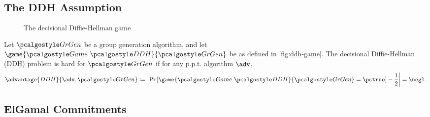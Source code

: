 \subsection{The DDH Assumption}

\begin{figure}[tbhp]
  \begin{center}
    \begin{tcolorbox}[width=6cm]
      \begin{pchstack}[center]
      \end{pchstack}
    \end{tcolorbox}
  \end{center}
  \caption{The decisional Diffie-Hellman game\label{fig:ddh-game}}
\end{figure}

\begin{definition}
  Let $\grgen$ be a group generation algorithm, and let $\game{\Game~\algo{DDH}}{\grgen}$ be as defined in \autoref{fig:ddh-game}.
  The decisional Diffie-Hellman (DDH) problem is hard for $\grgen$ if for any p.p.t. algorithm $\adv$,
  \[
  \advantage{DDH}{\adv, \grgen} \defeq \left|\pr{\game{\Game~\algo{DDH}}{\grgen} = \pctrue} - \frac{1}{2}\right| = \negl.
  \]
\end{definition}

\subsection{ElGamal Commitments}

